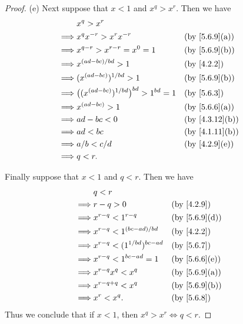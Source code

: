 \begin{proof}{(e)}
  Next suppose that \(x < 1\) and \(x^q > x^r\).
  Then we have
  \begin{align*}
             & x^q > x^r                                                                \\
    \implies & x^q x^{-r} > x^r x^{-r}                              &  & \by{5.6.9}[a]  \\
    \implies & x^{q - r} > x^{r - r} = x^0 = 1                      &  & \by{5.6.9}[b]  \\
    \implies & x^{(ad - bc) / bd} > 1                               &  & \by{4.2.2}     \\
    \implies & (x^{(ad - bc)})^{1 / bd} > 1                         &  & \by{5.6.9}[b]  \\
    \implies & \big((x^{(ad - bc)})^{1 / bd}\big)^{bd} > 1^{bd} = 1 &  & \by{5.6.3}     \\
    \implies & x^{(ad - bc)} > 1                                    &  & \by{5.6.6}[a]  \\
    \implies & ad - bc < 0                                          &  & \by{4.3.12}[b] \\
    \implies & ad < bc                                              &  & \by{4.1.11}[b] \\
    \implies & a / b < c / d                                        &  & \by{4.2.9}[e]  \\
    \implies & q < r.
  \end{align*}

  Finally suppose that \(x < 1\) and \(q < r\).
  Then we have
  \begin{align*}
             & q < r                                                 \\
    \implies & r - q > 0                          &  & \by{4.2.9}    \\
    \implies & x^{r - q} < 1^{r - q}              &  & \by{5.6.9}[d] \\
    \implies & x^{r - q} < 1^{(bc - ad) / bd}     &  & \by{4.2.2}    \\
    \implies & x^{r - q} < (1^{1 / bd})^{bc - ad} &  & \by{5.6.7}    \\
    \implies & x^{r - q} < 1^{bc - ad} = 1        &  & \by{5.6.6}[e] \\
    \implies & x^{r - q} x^q < x^q                &  & \by{5.6.9}[a] \\
    \implies & x^{r - q + q} < x^q                &  & \by{5.6.9}[b] \\
    \implies & x^r < x^q.                         &  & \by{5.6.8}
  \end{align*}
  Thus we conclude that if \(x < 1\), then \(x^q > x^r \iff q < r\).
\end{proof}

